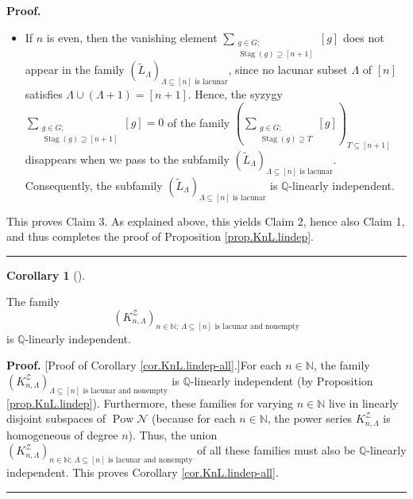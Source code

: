 \documentclass[numbers=enddot,12pt,final,onecolumn,notitlepage]{scrartcl}%
\theoremstyle{definition}
\newtheorem{coro}[theo]{Corollary}
\newenvironment{corollary}[1][]
{\begin{coro}[#1]\begin{leftbar}}
{\end{leftbar}\end{coro}}
\newenvironment{proof}[1][Proof]{\noindent\textbf{#1.} }{\ \rule{0.5em}{0.5em}}
\let\sumnonlimits\sum
\renewcommand{\sum}{\sumnonlimits\limits}
\begin{document}
\begin{proof}
\begin{itemize}
\item If $n$ is even, then the vanishing element $\sum_{\substack{g\in
G;\\\operatorname*{Stag}\left(  g\right)  \supseteq\left[  n+1\right]
}}\left[  g\right]  $ does not appear in the family $\left(  \widetilde{L}%
_{\Lambda}\right)  _{\Lambda\subseteq\left[  n\right]  \text{ is lacunar}}$,
since no lacunar subset $\Lambda$ of $\left[  n\right]  $ satisfies
$\Lambda\cup\left(  \Lambda+1\right)  =\left[  n+1\right]  $. Hence, the
syzygy $\sum_{\substack{g\in G;\\\operatorname*{Stag}\left(  g\right)
\supseteq\left[  n+1\right]  }}\left[  g\right]  =0$ of the family $\left(
\sum_{\substack{g\in G;\\\operatorname*{Stag}\left(  g\right)  \supseteq
T}}\left[  g\right]  \right)  _{T\subseteq\left[  n+1\right]  }$ disappears
when we pass to the subfamily $\left(  \widetilde{L}_{\Lambda}\right)
_{\Lambda\subseteq\left[  n\right]  \text{ is lacunar}}$. Consequently, the
subfamily $\left(  \widetilde{L}_{\Lambda}\right)  _{\Lambda\subseteq\left[
n\right]  \text{ is lacunar}}$ is $\mathbb{Q}$-linearly independent.
\end{itemize}

This proves Claim 3. As explained above, this yields Claim 2, hence also Claim
1, and thus completes the proof of Proposition \ref{prop.KnL.lindep}.
\end{proof}

\begin{corollary}
\label{cor.KnL.lindep-all}The family%
\[
\left(  K_{n,\Lambda}^{\mathcal{Z}}\right)  _{n\in\mathbb{N};\ \Lambda
\subseteq\left[  n\right]  \text{ is lacunar and nonempty}}%
\]
is $\mathbb{Q}$-linearly independent.
\end{corollary}

\begin{proof}
[Proof of Corollary \ref{cor.KnL.lindep-all}.]For each $n\in\mathbb{N}$, the
family $\left(  K_{n,\Lambda}^{\mathcal{Z}}\right)  _{\Lambda\subseteq\left[
n\right]  \text{ is lacunar and nonempty}}$ is $\mathbb{Q}$-linearly
independent (by Proposition \ref{prop.KnL.lindep}). Furthermore, these
families for varying $n\in\mathbb{N}$ live in linearly disjoint subspaces of
$\operatorname*{Pow}\mathcal{N}$ (because for each $n\in\mathbb{N}$, the power
series $K_{n,\Lambda}^{\mathcal{Z}}$ is homogeneous of degree $n$). Thus, the
union $\left(  K_{n,\Lambda}^{\mathcal{Z}}\right)  _{n\in\mathbb{N}%
;\ \Lambda\subseteq\left[  n\right]  \text{ is lacunar and nonempty}}$ of all
these families must also be $\mathbb{Q}$-linearly independent. This proves
Corollary \ref{cor.KnL.lindep-all}.
\end{proof}
\end{document}
